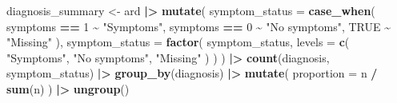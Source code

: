 \documentclass[
  british,
]{article}
\newenvironment{Shaded}{\begin{snugshade}}{\end{snugshade}}
\newcommand{\AttributeTok}[1]{\textcolor[rgb]{0.13,0.29,0.53}{#1}}
\newcommand{\ConstantTok}[1]{\textcolor[rgb]{0.56,0.35,0.01}{#1}}
\newcommand{\DecValTok}[1]{\textcolor[rgb]{0.00,0.00,0.81}{#1}}
\newcommand{\FunctionTok}[1]{\textcolor[rgb]{0.13,0.29,0.53}{\textbf{#1}}}
\newcommand{\NormalTok}[1]{#1}
\newcommand{\OtherTok}[1]{\textcolor[rgb]{0.56,0.35,0.01}{#1}}
\newcommand{\SpecialCharTok}[1]{\textcolor[rgb]{0.81,0.36,0.00}{\textbf{#1}}}
\newcommand{\StringTok}[1]{\textcolor[rgb]{0.31,0.60,0.02}{#1}}
\begin{document}
\begin{Shaded}
\begin{Highlighting}[]
\NormalTok{diagnosis\_summary }\OtherTok{\textless{}{-}}\NormalTok{ ard }\SpecialCharTok{|\textgreater{}}
  \FunctionTok{mutate}\NormalTok{(}
    \AttributeTok{symptom\_status =} \FunctionTok{case\_when}\NormalTok{(}
\NormalTok{      symptoms }\SpecialCharTok{==} \DecValTok{1} \SpecialCharTok{\textasciitilde{}} \StringTok{"Symptoms"}\NormalTok{,}
\NormalTok{      symptoms }\SpecialCharTok{==} \DecValTok{0} \SpecialCharTok{\textasciitilde{}} \StringTok{"No symptoms"}\NormalTok{,}
      \ConstantTok{TRUE} \SpecialCharTok{\textasciitilde{}} \StringTok{"Missing"}
\NormalTok{    ),}
    \AttributeTok{symptom\_status =} \FunctionTok{factor}\NormalTok{(}
\NormalTok{      symptom\_status,}
      \AttributeTok{levels =} \FunctionTok{c}\NormalTok{(}
        \StringTok{"Symptoms"}\NormalTok{,}
        \StringTok{"No symptoms"}\NormalTok{,}
        \StringTok{"Missing"}
\NormalTok{      )}
\NormalTok{    )}
\NormalTok{  ) }\SpecialCharTok{|\textgreater{}}
  \FunctionTok{count}\NormalTok{(diagnosis, symptom\_status) }\SpecialCharTok{|\textgreater{}}
  \FunctionTok{group\_by}\NormalTok{(diagnosis) }\SpecialCharTok{|\textgreater{}}
  \FunctionTok{mutate}\NormalTok{(}
    \AttributeTok{proportion =}\NormalTok{ n }\SpecialCharTok{/} \FunctionTok{sum}\NormalTok{(n)}
\NormalTok{  ) }\SpecialCharTok{|\textgreater{}}
  \FunctionTok{ungroup}\NormalTok{()}


\end{Highlighting}
\end{Shaded}
\end{document}
